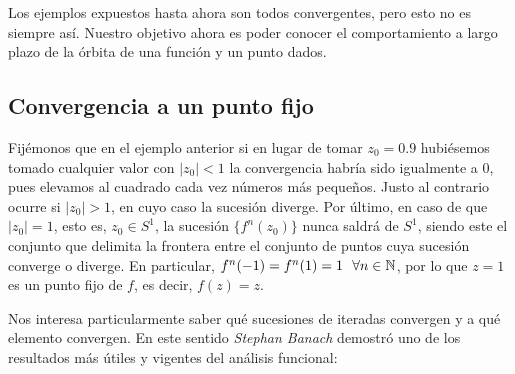 Los ejemplos expuestos hasta ahora son todos convergentes, pero esto no es siempre así. Nuestro objetivo ahora es poder conocer el comportamiento a largo plazo de la órbita de una función y un punto dados. 

\subsection{Convergencia a un punto fijo}
\label{subsection:convergencia-punto-fijo}

Fijémonos que en el ejemplo anterior si en lugar de tomar $z_0=0.9$ hubiésemos tomado cualquier valor con $|z_0|<1$ la convergencia habría sido igualmente a $0$, pues elevamos al cuadrado cada vez números más pequeños. Justo al contrario ocurre si $|z_0|>1$, en cuyo caso la sucesión diverge. Por último, en caso de que $|z_0|=1$, esto es, $z_0\in S^1$, la sucesión $\{f^n(z_0)\}$ nunca saldrá de $S^1$, siendo este el conjunto que delimita la frontera entre el conjunto de puntos cuya sucesión converge o diverge. En particular, $f^n(-1)=f^n(1)=1\ \ \forall n\in\mathbb{N}$, por lo que $z=1$ es un punto fijo de $f$, es decir, $f(z)=z$. 

Nos interesa particularmente saber qué sucesiones de iteradas convergen y a qué elemento convergen. En este sentido \textit{Stephan Banach} demostró uno de los resultados más útiles y vigentes del análisis funcional:


